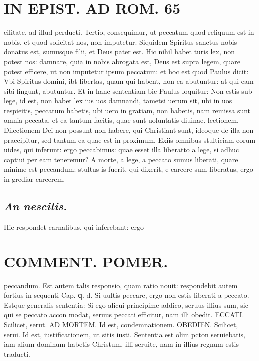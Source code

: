 \documentclass{article}
\begin{document}
\begin{pages}
\section*{IN EPIST. AD ROM.  65 }
\marginpar{[ p.]}\pstart eilitate, ad illud perducti. Tertio, consequimur, ut peccatum quod reliquum est in nobis, et quod solicitat nos, non imputetur. Siquidem Spiritus sanctus nobis donatus est, sumusque filii, et Deus pater est.  Hic nihil habet turis lex, non potest nos: damnare, quia in nobis abrogata est, Deus est supra legem, quare potest efficere, ut non imputetur ipsum peccatum: et hoc est quod Paulus dicit: Vbi Spiritus domini, ibt libertas, quam qui habent, non ea abutuntur: at qui eam sibi fingunt, abutuntur. Et in hanc sententiam bic Paulus loquitur: Non estis sub lege, id est, non habet lex ius uos damnandi, tametsi uerum sit, ubi in uos respieitis, peccatum habetis, ubi uero in gratiam, non habetis, nam remissa sunt omnia peccata, et ea tantum facitis, quae sunt uoluntatis diuinae.  lectionem. Dilectionem Dei non possunt non habere, qui Christiant sunt, ideoque de illa non praecipitur, sed tantum ea quae est in proximum. Exiis omnibus stulticiam eorum uides, qui inferunt: ergo peccabimus: quae esset illa liberatto a lege, si adhuc captiui per eam teneremur? A morte, a lege, a peccato sumus liberati, quare minime est peccandum: stultus is fuerit, qui dixerit, e carcere sum liberatus, ergo in grediar carcerem.   \pend
{}
{}
\subsection*{\textit{An nescitis. }}\pstart Hie respondet carnalibus, qui inferebant: ergo  \pend
\section*{COMMENT. POMER.  }\pstart peccandum. Est autem talis responsio, quam ratio nouit: respondebit autem fortius in sequenti Cap. ꝗ.  d. Si uultis peccare, ergo non estis liberati a peccato. Estque generalis sententia: Si ego alicui principime addico, seruus illius sum, sic qui se peccato accon modat, seruus peccati efficitur, nam illi obedit.  ECCATI. Scilicet, serut. AD MORTEM. Id est, condemnationem.  OBEDIEN. Scilicet, serui.   \pend\pstart Id est, iustificationem, ut sitis iusti. Sententia est olim pcton seruiebatis, iam alium dominum habetis Christum, illi seruite, nam in illius regnum estis traducti.   \pend
{}
{}

\end{pages}
\end{document}
